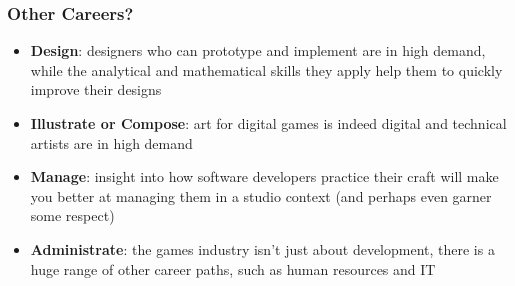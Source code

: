
\begin{frame}
	\frametitle{Other Careers?}
	
	\begin{itemize}
		\item 	\textbf{Design}: designers who can prototype and implement are in high demand, while the analytical and mathematical skills they apply help them to quickly improve their designs \pause
		\item 	\textbf{Illustrate or Compose}: art for digital games is indeed digital and technical artists are in high demand \pause
		\item 	\textbf{Manage}: insight into how software developers practice their craft will make you better at managing them in a studio context 
			(and perhaps even garner some respect) \pause
		\item 	\textbf{Administrate}: the games industry isn't just about development, there is a huge range of other career paths, such as human resources and IT
	\end{itemize}
\end{frame}

\fontsize{9pt}{7.2}\selectfont

